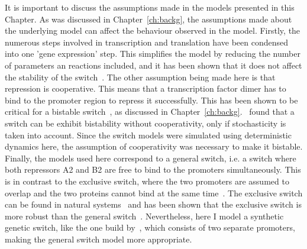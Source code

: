 It is important to discuss the assumptions made in the models presented in this Chapter. As was discussed in Chapter~\ref{ch:backg}, the assumptions made about the underlying model can affect the behaviour observed in the model. Firstly, the numerous steps involved in transcription and translation have been condensed into one 'gene expression' step.  This simplifies the model by reducing the number of parameters an reactions included, and it has been shown that it does not affect the stability of the switch~\autocite{Warren:2005kea}. The other assumption being made here is that repression is cooperative. This means that a transcription factor dimer has to bind to the promoter region to repress it successfully. This has been shown to be critical for a bistable switch~\autocite{Gardner:2000vha, Warren:2005kea, Warren:2004baa, Cherry:2000wi}, as discussed in Chapter~\ref{ch:backg}.~\textcite{Lipshtat:2006wb} found that a switch can be exhibit bistability without cooperativity, only if stochasticity is taken into account. Since the switch models were simulated using deterministic dynamics here, the assumption of cooperativity was necessary to make it bistable. Finally, the models used here correspond to a general switch, i.e. a switch where both repressors A2 and B2 are free to bind to the promoters simultaneously. This is in contrast to the exclusive switch, where the two promoters are assumed to overlap and the two proteins cannot bind at the same time~\autocite{Loinger:2007vma}. The exclusive switch can be found in natural systems~\autocite{lambda_sw} and has been shown that the exclusive switch is more robust than the general switch~\autocite{Loinger:2007vma, Barnes:2011hh}. Nevertheless, here I model a synthetic genetic switch, like the one build by~\textcite{Gardner:2000vha}, which consists of two separate promoters, making the general switch model more appropriate. 





